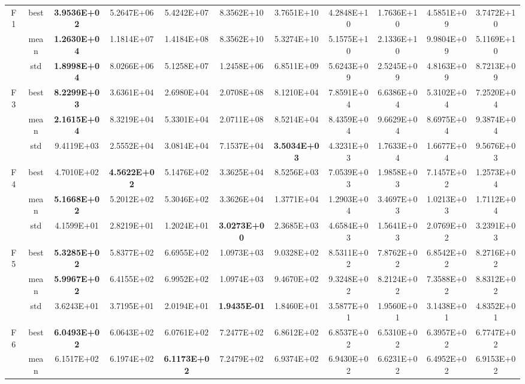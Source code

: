 \documentclass{wzuthesis}
\begin{document}
\begin{longtable}{ccccccccccc}
\multirow{3}[0]{*}{F1} & best  & \textbf{3.9536E+02} & 5.2647E+06 & 5.4242E+07 & 8.3562E+10 & 3.7651E+10 & 4.2848E+10 & 1.7636E+10 & 4.5851E+09 & 3.7472E+10 \\
          & mean  & \textbf{1.2630E+04} & 1.1814E+07 & 1.4184E+08 & 8.3562E+10 & 5.3274E+10 & 5.1575E+10 & 2.1336E+10 & 9.9804E+09 & 5.1169E+10 \\
          & std   & \textbf{1.8998E+04} & 8.0266E+06 & 5.1258E+07 & 1.2458E+06 & 6.8511E+09 & 5.6243E+09 & 2.5245E+09 & 4.8163E+09 & 8.7213E+09 \\
    \multirow{3}[0]{*}{F3} & best  & \textbf{8.2299E+03} & 3.6361E+04 & 2.6980E+04 & 2.0708E+08 & 8.1210E+04 & 7.8591E+04 & 6.6386E+04 & 5.3102E+04 & 7.2520E+04 \\
          & mean  & \textbf{2.1615E+04} & 8.3219E+04 & 5.3301E+04 & 2.0711E+08 & 8.5214E+04 & 8.4359E+04 & 9.6629E+04 & 8.6975E+04 & 9.3874E+04 \\
          & std   & 9.4119E+03 & 2.5552E+04 & 3.0814E+04 & 7.1537E+04 & \textbf{3.5034E+03} & 4.3231E+03 & 1.7633E+04 & 1.6677E+04 & 9.5676E+03 \\
    \multirow{3}[0]{*}{F4} & best  & 4.7010E+02 & \textbf{4.5622E+02} & 5.1476E+02 & 3.3625E+04 & 8.5256E+03 & 7.0539E+03 & 1.9858E+03 & 7.1457E+02 & 1.2573E+04 \\
          & mean  & \textbf{5.1668E+02} & 5.2012E+02 & 5.3046E+02 & 3.3626E+04 & 1.3771E+04 & 1.2903E+04 & 3.4697E+03 & 1.0213E+03 & 1.7112E+04 \\
          & std   & 4.1599E+01 & 2.8219E+01 & 1.2024E+01 & \textbf{3.0273E+00} & 2.3685E+03 & 4.6584E+03 & 1.5641E+03 & 2.0769E+02 & 3.2391E+03 \\
    \multirow{3}[0]{*}{F5} & best  & \textbf{5.3285E+02} & 5.8377E+02 & 6.6955E+02 & 1.0973E+03 & 9.0328E+02 & 8.5311E+02 & 7.8762E+02 & 6.8542E+02 & 8.2716E+02 \\
          & mean  & \textbf{5.9967E+02} & 6.4155E+02 & 6.9952E+02 & 1.0974E+03 & 9.4670E+02 & 9.3248E+02 & 8.2124E+02 & 7.3588E+02 & 8.8312E+02 \\
          & std   & 3.6243E+01 & 3.7195E+01 & 2.0194E+01 & \textbf{1.9435E-01} & 1.8460E+01 & 3.5877E+01 & 1.9560E+01 & 3.1438E+01 & 4.8352E+01 \\
    \multirow{3}[0]{*}{F6} & best  & \textbf{6.0493E+02} & 6.0643E+02 & 6.0761E+02 & 7.2477E+02 & 6.8612E+02 & 6.8537E+02 & 6.5310E+02 & 6.3957E+02 & 6.7747E+02 \\
          & mean  & 6.1517E+02 & 6.1974E+02 & \textbf{6.1173E+02} & 7.2479E+02 & 6.9374E+02 & 6.9430E+02 & 6.6231E+02 & 6.4952E+02 & 6.9153E+02 \\

\end{longtable}
\end{document}
